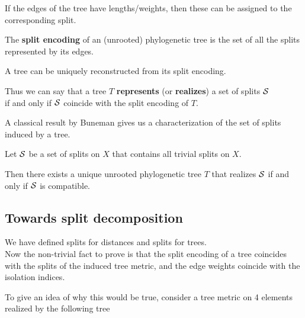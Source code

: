 \documentclass[./main.tex]{subfiles}
\begin{document}
If the edges of the tree have lengths/weights, then these can be assigned to the corresponding split.

The \textbf{split encoding} of an (unrooted) phylogenetic tree is the set of all the splits represented by its edges.

\begin{figure}[h]
    \centering
\end{figure}

\begin{remarklike}[Fact]
    A tree can be uniquely reconstructed from its split encoding.
\end{remarklike}

Thus we can say that a tree $T$ \textbf{represents} (or \textbf{realizes}) a set of splits ${\mathcal{S}}$ \\
\bsp if and only if ${\mathcal{S}}$ coincide with the split encoding of $T$.\bigskip

A classical result by Buneman \cite{Bun72} gives us a characterization of the set of splits induced by a tree.

\begin{remarklike}[Fact]
    Let ${\mathcal{S}}$ be a set of splits on $X$ that contains all trivial splits on $X$.
    
    Then there exists a unique unrooted phylogenetic tree $T$ that realizes ${\mathcal{S}}$ if and only if ${\mathcal{S}}$ is compatible.
\end{remarklike}

\clearpage


\subsection*{Towards split decomposition}

We have defined splits for distances and splits for trees. \\
Now the non-trivial fact to prove is that the split encoding of a tree coincides with the splits of the induced tree metric, and the edge weights coincide with the isolation indices.\bigskip

To give an idea of why this would be true, consider a tree metric on 4 elements realized by the following tree
\begin{figure}[h]
    \centering
\end{figure}
\end{document}
